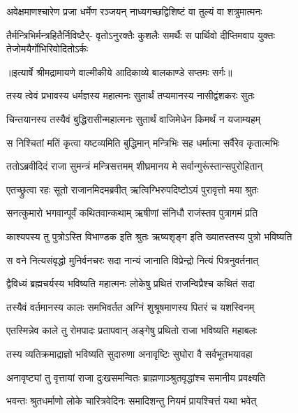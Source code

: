 \twolineshloka
{अवेक्षमाणश्चारेण प्रजा धर्मेण रञ्जयन्}
{नाध्यगच्छद्विशिष्टं वा तुल्यं वा शत्रुमात्मनः} %

\fourlineindentedshloka
{तैर्मन्त्रिभिर्मन्त्रहितैर्निविष्टैर्-}
{वृतोऽनुरक्तैः कुशलैः समर्थैः}
{स पार्थिवो दीप्तिमवाप युक्तः}
{तेजोमयैर्गोभिरिवोदितोऽर्कः} %


{॥इत्यार्षे श्रीमद्रामायणे वाल्मीकीये आदिकाव्ये बालकाण्डे सप्तमः सर्गः॥}


\twolineshloka
{तस्य त्वेवं प्रभावस्य धर्मज्ञस्य महात्मनः}
{सुतार्थं तप्यमानस्य नासीद्वंशकरः सुतः} %

\twolineshloka
{चिन्तयानस्य तस्यैवं बुद्धिरासीन्महात्मनः}
{सुतार्थं वाजिमेधेन किमर्थं न यजाम्यहम्} %

\twolineshloka
{स निश्चितां मतिं कृत्वा यष्टव्यमिति बुद्धिमान्}
{मन्त्रिभिः सह धर्मात्मा सर्वैरेव कृतात्मभिः} %

\twolineshloka
{ततोऽब्रवीदिदं राजा सुमन्त्रं मन्त्रिसत्तमम्}
{शीघ्रमानय मे सर्वान्गुरूंस्तान्सपुरोहितान्} %

\twolineshloka
{एतच्छ्रुत्वा रहः सूतो राजानमिदमब्रवीत्}
{ऋत्विग्भिरुपदिष्टोऽयं पुरावृत्तो मया श्रुतः} %

\twolineshloka
{सनत्कुमारो भगवान्पूर्वं कथितवान्कथाम्}
{ऋषीणां संनिधौ राजंस्तव पुत्रागमं प्रति} %

\twolineshloka
{काश्यपस्य तु पुत्रोऽस्ति विभाण्डक इति श्रुतः}
{ऋष्यशृङ्ग इति ख्यातस्तस्य पुत्रो भविष्यति} %

\twolineshloka
{स वने नित्यसंवृद्धो मुनिर्वनचरः सदा}
{नान्यं जानाति विप्रेन्द्रो नित्यं पित्रनुवर्तनात्} %

\twolineshloka
{द्वैविध्यं ब्रह्मचर्यस्य भविष्यति महात्मनः}
{लोकेषु प्रथितं राजन्विप्रैश्च कथितं सदा} %

\twolineshloka
{तस्यैवं वर्तमानस्य कालः समभिवर्तत}
{अग्निं शुश्रूषमाणस्य पितरं च यशस्विनम्} %

\twolineshloka
{एतस्मिन्नेव काले तु रोमपादः प्रतापवान्}
{अङ्गेषु प्रथितो राजा भविष्यति महाबलः} %

\twolineshloka
{तस्य व्यतिक्रमाद्राज्ञो भविष्यति सुदारुणा}
{अनावृष्टिः सुघोरा वै सर्वभूतभयावहा} %

\twolineshloka
{अनावृष्ट्यां तु वृत्तायां राजा दुःखसमन्वितः}
{ब्राह्मणाञ्श्रुतवृद्धांश्च समानीय प्रवक्ष्यति} %

\twolineshloka
{भवन्तः श्रुतधर्माणो लोके चारित्रवेदिनः}
{समादिशन्तु नियमं प्रायश्चित्तं यथा भवेत्} %

